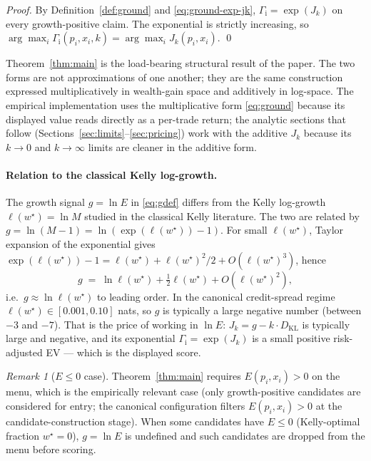 \documentclass[11pt]{article}
\theoremstyle{definition}
\theoremstyle{remark}
\newtheorem{remark}[theorem]{Remark}
\newcommand{\G}{g}
\newcommand{\KL}{D_{\mathrm{KL}}}
\newcommand{\GROUND}{\Gamma_{\mathrm{i}}}
\begin{document}
\begin{proof}
By Definition~\ref{def:ground} and \eqref{eq:ground-exp-jk},
$\GROUND = \exp(J_k)$ on every growth-positive claim. The
exponential is strictly increasing, so
$\arg\max_i \GROUND(p_i, x_i, k) = \arg\max_i J_k(p_i, x_i)$. \qed
\end{proof}

Theorem~\ref{thm:main} is the load-bearing structural result of the
paper. The two forms are not approximations of one another; they are
the same construction expressed multiplicatively in wealth-gain space
and additively in log-space. The empirical implementation uses the
multiplicative form \eqref{eq:ground} because its displayed value
reads directly as a per-trade return; the analytic sections that
follow (Sections~\ref{sec:limits}--\ref{sec:pricing}) work with the
additive $J_k$ because its $k \to 0$ and $k \to \infty$ limits are
cleaner in the additive form.

\paragraph{Relation to the classical Kelly log-growth.}
The growth signal $\G = \ln E$ in \eqref{eq:gdef} differs from the
Kelly log-growth $\ell(w^\star) = \ln M$ studied in the classical
Kelly literature. The two are related by $\G = \ln(M - 1)
= \ln(\exp(\ell(w^\star)) - 1)$. For small $\ell(w^\star)$, Taylor
expansion of the exponential gives $\exp(\ell(w^\star)) - 1 =
\ell(w^\star) + \ell(w^\star)^2/2 + O(\ell(w^\star)^3)$, hence
\begin{equation}
\G \;=\; \ln \ell(w^\star) + \tfrac{1}{2} \ell(w^\star) + O(\ell(w^\star)^2),
\label{eq:g-vs-ell-taylor}
\end{equation}
i.e.\ $\G \approx \ln \ell(w^\star)$ to leading order. In the
canonical credit-spread regime $\ell(w^\star) \in [0.001, 0.10]$ nats,
so $\G$ is typically a large negative number (between $-3$ and $-7$).
That is the price of working in $\ln E$: $J_k = \G - k \cdot \KL$ is
typically large and negative, and its exponential $\GROUND = \exp(J_k)$
is a small positive risk-adjusted EV --- which is the displayed score.

\begin{remark}[$E \le 0$ case]\label{rem:Gneg}
Theorem~\ref{thm:main} requires $E(p_i, x_i) > 0$ on the menu, which
is the empirically relevant case (only growth-positive candidates are
considered for entry; the canonical configuration filters
$E(p_i, x_i) > 0$ at the candidate-construction stage). When some
candidates have $E \le 0$ (Kelly-optimal fraction $w^\star = 0$),
$\G = \ln E$ is undefined and such candidates are dropped from the
menu before scoring.
\end{remark}
\end{document}
